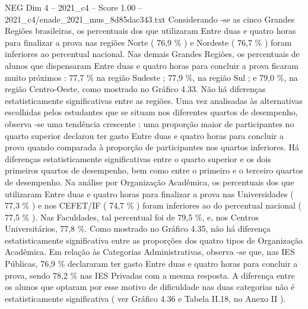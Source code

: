 \begin{textsample}{NEG Dim 4 – 2021\_c4 – Score 1.00 – 2021\_c4/enade\_2021\_mus\_8d85dac343.txt}
Considerando -se as cinco Grandes Regiões brasileiras, os percentuais dos que utilizaram Entre duas e quatro horas para finalizar a prova nas regiões Norte ( 76,9 \% ) e Nordeste ( 76,7 \% ) foram inferiores ao percentual nacional.
Nas demais Grandes Regiões, os percentuais de alunos que dispensaram Entre duas e quatro horas para concluir a prova ficaram muito próximos : 77,7 \% na região Sudeste ; 77,9 \%, na região Sul ; e 79,0 \%, na região Centro-Oeste, como mostrado no Gráfico 4.33.
Não há diferenças estatisticamente significativas entre as regiões.
Uma vez analisadas às alternativas escolhidas pelos estudantes que se situam nos diferentes quartos de desempenho, observa -se uma tendência crescente : uma proporção maior de participantes no quarto superior declarou ter gasto Entre duas e quatro horas para concluir a prova quando comparada à proporção de participantes nos quartos inferiores.
Há diferenças estatisticamente significativas entre o quarto superior e os dois primeiros quartos de desempenho, bem como entre o primeiro e o terceiro quartos de desempenho.
Na análise por Organização Acadêmica, os percentuais dos que utilizaram Entre duas e quatro horas para finalizar a prova nas Universidades ( 77,3 \% ) e nos CEFET/IF ( 74,7 \% ) foram inferiores ao do percentual nacional ( 77,5 \% ).
Nas Faculdades, tal percentual foi de 79,5 \%, e, nos Centros Universitários, 77,8 \%.
Como mostrado no Gráfico 4.35, não há diferença estatisticamente significativa entre as proporções dos quatro tipos de Organização Acadêmica.
Em relação às Categorias Administrativas, observa -se que, nas IES Públicas, 76,9 \% declararam ter gasto Entre duas e quatro horas para concluir a prova, sendo 78,2 \% nas IES Privadas com a mesma resposta.
A diferença entre os alunos que optaram por esse motivo de dificuldade nas duas categorias não é estatisticamente significativa ( ver Gráfico 4.36 e Tabela II.18, no Anexo II ).

\end{textsample}
